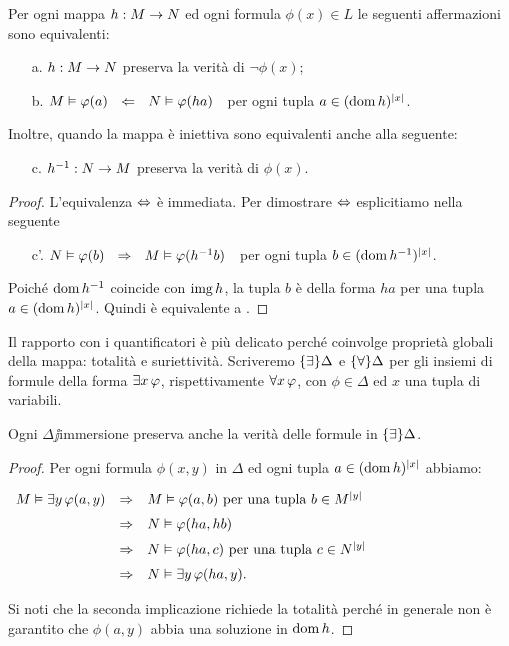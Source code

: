 \begin{proposition}\label{immparneginv}
Per ogni mappa $h:M\rightarrow N$ ed ogni formula $\phi(x)\in L$ le seguenti affermazioni sono equivalenti:
\begin{itemize}
\item[a.] $h:M\rightarrow N$ preserva la verit\`a di $\neg\phi(x)$;
\item[b.] $M\vDash\varphi(a)\ \ \Leftarrow\ \ N\vDash\varphi(ha)$\ \  per ogni tupla $a\in(\mathop{\rm dom} h)^{|x|}$.
\end{itemize}
Inoltre, quando la mappa \`e iniettiva sono equivalenti anche alla seguente:
\begin{itemize}
\item[c.]   $h^{-1}:N\rightarrow M$ preserva la verit\`a di $\phi(x)$.\QED
\end{itemize}
\end{proposition}
\begin{proof}
L'equivalenza $\Leftrightarrow$ \`e immediata. Per dimostrare $\Leftrightarrow$ esplicitiamo  nella seguente
\begin{itemize}
\item[c'.]$N\vDash\varphi(b)\ \ \Rightarrow\ \ M\vDash\varphi(h^{-1}b)$\ \  per ogni tupla $b\in(\mathop{\rm dom} h^{-1})^{|x|}$.
\end{itemize}
Poich\'e $\mathop{\rm dom} h^{-1}$ coincide con $\mathop{\rm img} h$, la tupla $b$ \`e della forma $ha$ per una tupla  $a\in(\mathop{\rm dom} h)^{|x|}$. Quindi  \`e equivalente a .
\end{proof}

Il rapporto con i quantificatori \`e pi\`u delicato perch\'e coinvolge propriet\`a globali della mappa: totalit\`a e suriettivit\`a. Scriveremo $\{\exists\}\Delta$ e $\{\forall\}\Delta$ per gli insiemi di formule della forma $\exists x\,\varphi$, rispettivamente $\forall x\,\varphi$, con $\phi\in\Delta$ ed $x$ una tupla di variabili.


\begin{proposition}\label{presesis}
Ogni $\Delta\jj$immersione preserva anche la verit\`a delle formule in $\{\exists\}\Delta$.
\end{proposition}
\begin{proof}
Per ogni formula $\phi(x,y)$ in $\Delta$ ed ogni tupla  $a\in(\mathop{\rm dom} h)^{|x|}$ abbiamo:

\hfil
$\begin{array}{rcl}
M\models\E y\,\phi(a,y) %
&\IMP& M\models\phi(a,b)\textrm{ per una tupla } b\in M^{|y|}  \\[2mm]
&\IMP& N\models\phi(ha,hb) \\[2mm]
&\IMP& N\models\phi(ha,c)\textrm{ per una tupla } c\in N^{|y|}  \\[2mm]
&\IMP& N\models\E y\,\phi(ha,y).\\
\end{array}$

Si noti che la seconda implicazione richiede la totalit\`a perch\'e in generale non \`e garantito che $\phi(a,y)$ abbia una soluzione in $\mathop{\rm dom} h$.
\end{proof}

